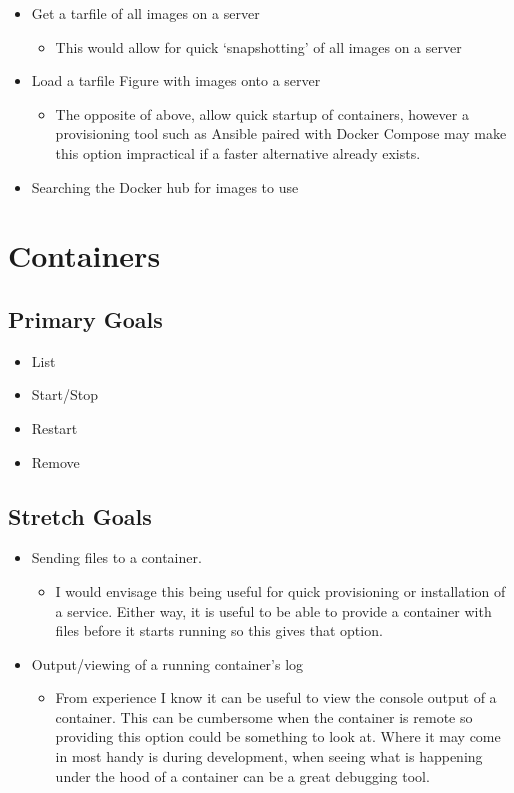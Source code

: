 \documentclass{article}
\begin{document}
\begin{itemize}
	\item Get a tarfile of all images on a server
	\begin{itemize}
		\item This would allow for quick `snapshotting' of all images on a server
	\end{itemize}
	\item Load a tarfile Figure with images onto a server
	\begin{itemize}
		\item The opposite of above, allow quick startup of containers, however a provisioning tool such as Ansible paired with Docker Compose may make this option impractical if a faster alternative already exists.
	\end{itemize}
	\item Searching the Docker hub for images to use
\end{itemize}

\newpage

\section{Containers}

\subsection{Primary Goals}
\begin{itemize}
	\item List
	\item Start/Stop
	\item Restart
	\item Remove
\end{itemize}
\subsection{Stretch Goals}
\begin{itemize}
	\item Sending files to a container.
	\begin{itemize}
		\item I would envisage this being useful for quick provisioning or installation of a service. Either way, it is useful to be able to provide a container with files before it starts running so this gives that option.
	\end{itemize}
	\item Output/viewing of a running container's log
	\begin{itemize}
		\item From experience I know it can be useful to view the console output of a container. This can be cumbersome when the container is remote so providing this option could be something to look at. Where it may come in most handy is during development, when seeing what is happening under the hood of a container can be a great debugging tool.
	\end{itemize}
\end{itemize}
\end{document}
